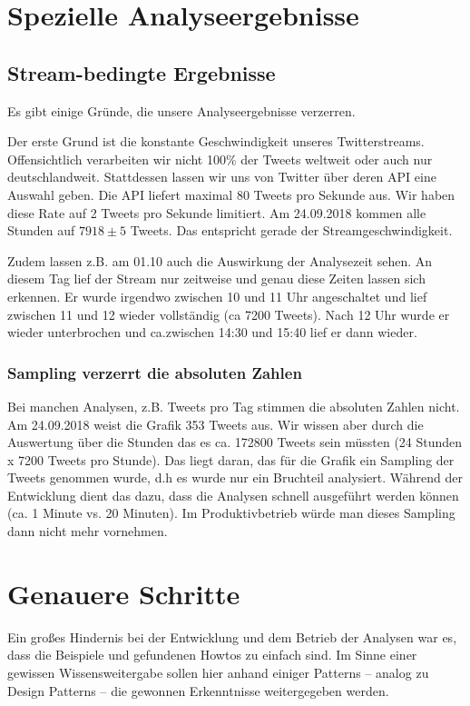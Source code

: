 \section{Spezielle
Analyseergebnisse}
\subsection{Stream-bedingte Ergebnisse}
Es gibt einige Gründe, die unsere Analyseergebnisse verzerren.

Der erste Grund ist die konstante Geschwindigkeit unseres
Twitterstreams. Offensichtlich verarbeiten wir nicht 100\% der Tweets
weltweit oder auch nur deutschlandweit. Stattdessen lassen wir uns von
Twitter über deren API eine Auswahl geben. Die API liefert maximal 80
Tweets pro Sekunde aus. Wir haben diese Rate auf 2 Tweets pro Sekunde
limitiert. Am 24.09.2018 kommen alle
Stunden auf $7918 \pm 5$ Tweets. Das entspricht gerade
der Streamgeschwindigkeit.

Zudem lassen z.B. am 01.10 auch die Auswirkung der Analysezeit sehen. An
diesem Tag lief der Stream nur zeitweise und genau diese Zeiten lassen
sich erkennen. Er wurde irgendwo zwischen 10 und 11 Uhr angeschaltet
und lief zwischen 11 und 12 wieder vollständig (ca 7200 Tweets). Nach
12 Uhr wurde er wieder unterbrochen und ca.zwischen 14:30 und 15:40
lief er dann wieder. 

\subsubsection{Sampling verzerrt die absoluten
Zahlen}
Bei manchen Analysen, z.B. Tweets pro Tag stimmen die absoluten Zahlen
nicht. Am 24.09.2018 weist die Grafik 353 Tweets aus. Wir wissen aber
durch die Auswertung über die Stunden das es ca. 172800 Tweets sein
müssten (24 Stunden x 7200 Tweets pro Stunde). Das liegt daran, das
für die Grafik ein Sampling der Tweets genommen wurde, d.h es wurde nur
ein Bruchteil analysiert. Während der Entwicklung dient das dazu, dass
die Analysen schnell ausgeführt werden können (ca. 1 Minute vs. 20
Minuten). Im Produktivbetrieb würde man dieses Sampling dann nicht mehr
vornehmen.

\section{Genauere Schritte}
Ein großes Hindernis bei der Entwicklung und dem Betrieb der Analysen
war es, dass die Beispiele und gefundenen Howtos zu einfach sind. Im
Sinne einer gewissen Wissensweitergabe sollen hier anhand einiger
Patterns – analog zu Design Patterns – die gewonnen Erkenntnisse
weitergegeben werden. 

